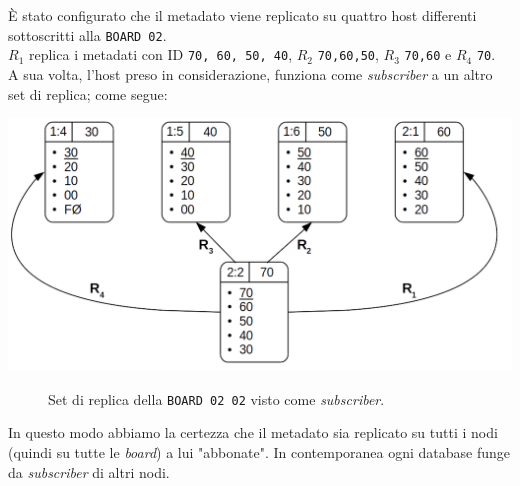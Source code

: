 \`{E} stato configurato che il metadato viene replicato su quattro host differenti sottoscritti alla \verb"BOARD 02".\\
$R_1$ replica i metadati con ID \verb"70, 60, 50, 40", $R_2$ \verb"70,60,50", $R_3$ \verb"70,60" e $R_4$ \verb"70".\\
A sua volta, l'host preso in considerazione, funziona come \textit{subscriber} a un altro set di replica; come segue:

\begin{center}
\includegraphics[scale=0.50]{img/sub_replica.png}
\end{center}
\begin{figure}[htbp]
\caption{Set di replica della \verb"BOARD 02 02" visto come \textit{subscriber}. \label{figura1.17}}
\end{figure}

In questo modo abbiamo la certezza che il metadato sia replicato su tutti i nodi (quindi su tutte le \textit{board}) a lui "abbonate". In contemporanea ogni database funge da \textit{subscriber} di altri nodi.


